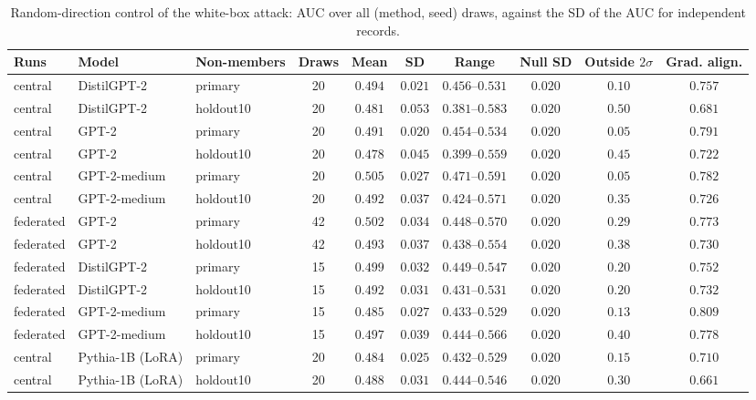 \begin{table}[t]
\centering
\caption{Random-direction control of the white-box attack: AUC over all (method, seed) draws, against the SD of the AUC for independent records.}
\label{tab:control}
\footnotesize
\renewcommand{\arraystretch}{1.2}
\setlength{\tabcolsep}{3pt}
\begin{tabular*}{\textwidth}{@{\extracolsep{\fill}}lllccccccc@{}}
\toprule
\textbf{Runs} & \textbf{Model} & \textbf{Non-members} & \textbf{Draws} & \textbf{Mean} & \textbf{SD} & \textbf{Range} & \textbf{Null SD} & \textbf{Outside $2\sigma$} & \textbf{Grad. align.} \\
\midrule
central & DistilGPT-2 & primary & 20 & $0.494$ & $0.021$ & $0.456$--$0.531$ & $0.020$ & $0.10$ & $0.757$ \\
central & DistilGPT-2 & holdout10 & 20 & $0.481$ & $0.053$ & $0.381$--$0.583$ & $0.020$ & $0.50$ & $0.681$ \\
central & GPT-2 & primary & 20 & $0.491$ & $0.020$ & $0.454$--$0.534$ & $0.020$ & $0.05$ & $0.791$ \\
central & GPT-2 & holdout10 & 20 & $0.478$ & $0.045$ & $0.399$--$0.559$ & $0.020$ & $0.45$ & $0.722$ \\
central & GPT-2-medium & primary & 20 & $0.505$ & $0.027$ & $0.471$--$0.591$ & $0.020$ & $0.05$ & $0.782$ \\
central & GPT-2-medium & holdout10 & 20 & $0.492$ & $0.037$ & $0.424$--$0.571$ & $0.020$ & $0.35$ & $0.726$ \\
federated & GPT-2 & primary & 42 & $0.502$ & $0.034$ & $0.448$--$0.570$ & $0.020$ & $0.29$ & $0.773$ \\
federated & GPT-2 & holdout10 & 42 & $0.493$ & $0.037$ & $0.438$--$0.554$ & $0.020$ & $0.38$ & $0.730$ \\
federated & DistilGPT-2 & primary & 15 & $0.499$ & $0.032$ & $0.449$--$0.547$ & $0.020$ & $0.20$ & $0.752$ \\
federated & DistilGPT-2 & holdout10 & 15 & $0.492$ & $0.031$ & $0.431$--$0.531$ & $0.020$ & $0.20$ & $0.732$ \\
federated & GPT-2-medium & primary & 15 & $0.485$ & $0.027$ & $0.433$--$0.529$ & $0.020$ & $0.13$ & $0.809$ \\
federated & GPT-2-medium & holdout10 & 15 & $0.497$ & $0.039$ & $0.444$--$0.566$ & $0.020$ & $0.40$ & $0.778$ \\
central & Pythia-1B (LoRA) & primary & 20 & $0.484$ & $0.025$ & $0.432$--$0.529$ & $0.020$ & $0.15$ & $0.710$ \\
central & Pythia-1B (LoRA) & holdout10 & 20 & $0.488$ & $0.031$ & $0.444$--$0.546$ & $0.020$ & $0.30$ & $0.661$ \\
\bottomrule
\end{tabular*}
\end{table}
